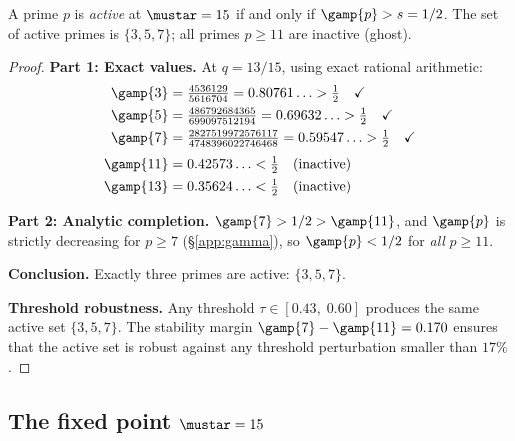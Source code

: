 \documentclass[12pt,a4paper]{article}
\begin{document}
\begin{theorembox}
A prime $p$ is \emph{active} at $\mustar = 15$ if and only if
$\gamp{p} > s = 1/2$. The set of active primes is $\{3, 5, 7\}$;
all primes $p \geq 11$ are inactive (ghost).

\begin{proof}
\textbf{Part 1: Exact values.}
At $q = 13/15$, using exact rational arithmetic:
\begin{align*}
\gamp{3} &= \tfrac{4536129}{5616704} = 0.80761\ldots > \tfrac{1}{2} \quad \checkmark \\
\gamp{5} &= \tfrac{486792684365}{699097512194} = 0.69632\ldots > \tfrac{1}{2} \quad \checkmark \\
\gamp{7} &= \tfrac{2827519972576117}{4748396022746468} = 0.59547\ldots > \tfrac{1}{2} \quad \checkmark \\[3pt]
\gamp{11} &= 0.42573\ldots < \tfrac{1}{2} \quad \text{(inactive)} \\
\gamp{13} &= 0.35624\ldots < \tfrac{1}{2} \quad \text{(inactive)}
\end{align*}

\textbf{Part 2: Analytic completion.}
$\gamp{7} > 1/2 > \gamp{11}$, and $\gamp{p}$ is strictly decreasing
for $p \geq 7$ (\S\ref{app:gamma}), so $\gamp{p} < 1/2$ for
\emph{all} $p \geq 11$.

\textbf{Conclusion.}
Exactly three primes are active: $\{3, 5, 7\}$.

\medskip\noindent
\textbf{Threshold robustness.}
Any threshold $\tau \in [0.43,\; 0.60]$ produces the same active set
$\{3, 5, 7\}$. The stability margin
$\gamp{7} - \gamp{11} = 0.170$ ensures that the active set is robust
against any threshold perturbation smaller than $17\%$.
\end{proof}
\end{theorembox}

\subsection{The fixed point $\mustar = 15$}
\label{app:fixed_point}
\end{document}

